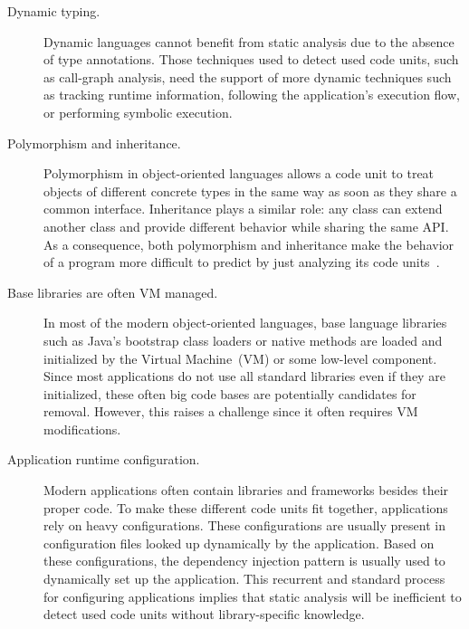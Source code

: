 \begin{description}

\item[Dynamic typing.] Dynamic languages cannot benefit from static analysis due to the absence of type annotations. Those techniques used to detect used code units, such as call-graph analysis, need the support of more dynamic techniques such as tracking runtime information, following the application's execution flow, or performing symbolic execution.

\item[Polymorphism and inheritance.] Polymorphism in object-oriented languages allows a code unit to treat objects of different concrete types in the same way as soon as they share a common interface. Inheritance plays a similar role: any class can extend another class and provide different behavior while sharing the same API.
As a consequence, both polymorphism and inheritance make the behavior of a program more difficult to predict by just analyzing its code units~\cite{ShortTaen89a}.

\item[Base libraries are often VM managed.] In most of the modern object-oriented languages, base language libraries such as Java's bootstrap class loaders or native methods are loaded and initialized by the Virtual Machine~(VM) or some low-level component. Since most applications do not use all standard libraries even if they are initialized, these often big code bases are potentially candidates for removal. However, this raises a challenge since it often requires VM modifications.

\item[Application runtime configuration.] Modern applications often contain libraries and frameworks besides their proper code. 
To make these different code units fit together, applications rely on heavy configurations. 
These configurations are usually present in configuration files looked up dynamically by the application. 
Based on these configurations, the dependency injection pattern is usually used to dynamically set up the application. 
This recurrent and standard process for configuring applications implies that static analysis will be inefficient to detect used code units without library-specific knowledge.



\end{description}
